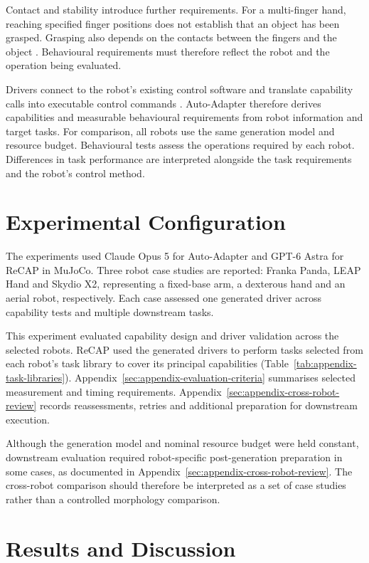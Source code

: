 Contact and stability introduce further requirements. For a multi-finger hand,
reaching specified finger positions does not establish that an object has been
grasped. Grasping also depends on the contacts between the fingers and the
object \citep{lynch2017modern}. Behavioural requirements must therefore
reflect the robot and the operation being evaluated.

Drivers connect to the robot's existing control software and translate
capability calls into executable control commands
\citep{pantano2022capabilitysurvey}. Auto-Adapter therefore derives capabilities
and measurable behavioural requirements from robot information and target
tasks. For comparison, all robots use the same generation model and resource
budget. Behavioural tests assess the operations required by each robot.
Differences in task performance are interpreted alongside the task requirements
and the robot's control method.

\section{Experimental Configuration}

The experiments used Claude Opus 5 for Auto-Adapter and GPT-6 Astra for ReCAP
in MuJoCo. Three robot case studies are reported: Franka Panda, LEAP Hand and
Skydio X2, representing a fixed-base arm, a dexterous hand and an aerial robot,
respectively. Each case assessed one generated driver across capability tests
and multiple downstream tasks.

This experiment evaluated capability
design and driver validation across the selected robots. ReCAP used
the generated drivers to perform tasks selected from each robot's task
library to cover its principal capabilities
(Table~\ref{tab:appendix-task-libraries}).
Appendix~\ref{sec:appendix-evaluation-criteria} summarises selected measurement
and timing requirements. Appendix~\ref{sec:appendix-cross-robot-review}
records reassessments, retries and additional preparation for downstream execution.

Although the generation model and nominal resource budget were held constant,
downstream evaluation required robot-specific post-generation preparation in
some cases, as documented in Appendix~\ref{sec:appendix-cross-robot-review}.
The cross-robot comparison should therefore be interpreted as a set of case
studies rather than a controlled morphology comparison.

\section{Results and Discussion}
\label{sec:cross-robot-results-discussion}

